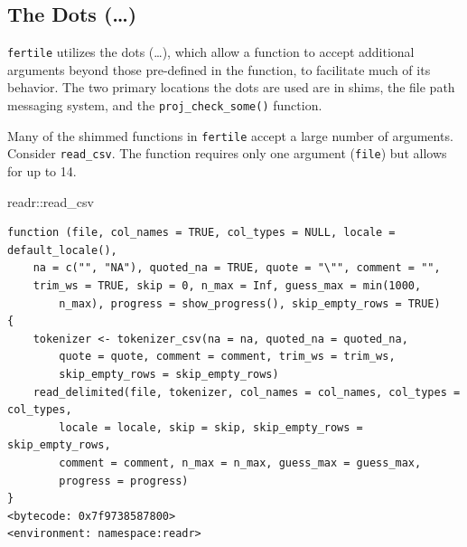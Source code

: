 \documentclass[12pt,twoside]{reedthesis}
\newenvironment{Shaded}{\begin{snugshade}}{\end{snugshade}}
\newcommand{\NormalTok}[1]{#1}
\newcommand{\SpecialCharTok}[1]{\textcolor[rgb]{0.00,0.00,0.00}{#1}}
\begin{document}
\hypertarget{the-dots}{%
\subsection{The Dots (\ldots)}\label{the-dots}}

\texttt{fertile} utilizes the dots (\ldots), which allow a function to accept additional arguments beyond those pre-defined in the function, to facilitate much of its behavior. The two primary locations the dots are used are in shims, the file path messaging system, and the \texttt{proj\_check\_some()} function.

Many of the shimmed functions in \texttt{fertile} accept a large number of arguments. Consider \texttt{read\_csv}. The function requires only one argument (\texttt{file}) but allows for up to 14.
\begin{Shaded}
\begin{Highlighting}[]
\NormalTok{readr}\SpecialCharTok{::}\NormalTok{read\_csv}
\end{Highlighting}
\end{Shaded}
\small
\begin{verbatim}
function (file, col_names = TRUE, col_types = NULL, locale = default_locale(), 
    na = c("", "NA"), quoted_na = TRUE, quote = "\"", comment = "", 
    trim_ws = TRUE, skip = 0, n_max = Inf, guess_max = min(1000, 
        n_max), progress = show_progress(), skip_empty_rows = TRUE) 
{
    tokenizer <- tokenizer_csv(na = na, quoted_na = quoted_na, 
        quote = quote, comment = comment, trim_ws = trim_ws, 
        skip_empty_rows = skip_empty_rows)
    read_delimited(file, tokenizer, col_names = col_names, col_types = col_types, 
        locale = locale, skip = skip, skip_empty_rows = skip_empty_rows, 
        comment = comment, n_max = n_max, guess_max = guess_max, 
        progress = progress)
}
<bytecode: 0x7f9738587800>
<environment: namespace:readr>
\end{verbatim}
\normalsize
\end{document}
